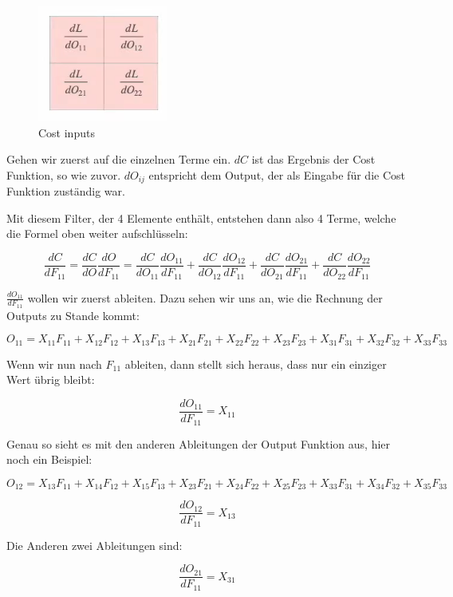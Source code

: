 \documentclass[12pt]{article}
\begin{document}

\begin{figure}[H]
\centering
\includegraphics[scale=0.80]{./Images/TemporaryPlaceholders/Bildschirmfoto vom 2024-05-20 17-15-41.png}
\caption{Cost inputs}
\label{Cost inputs}
\end{figure}

Gehen wir zuerst auf die einzelnen Terme ein. $dC$ ist das Ergebnis der Cost Funktion, so wie zuvor. $dO_{ij}$ entspricht dem Output, der als Eingabe für die Cost Funktion zuständig war.

Mit diesem Filter, der 4 Elemente enthält, entstehen dann also 4 Terme, welche die Formel oben weiter aufschlüsseln:

$$
\frac{dC}{dF_{11}} = 
\frac{dC} {dO} \frac{dO} {dF_{11}}= 
\frac{dC} {dO_{11}} \frac{dO_{11}} {dF_{11}}+
\frac{dC} {dO_{12}} \frac{dO_{12}} {dF_{11}}+
\frac{dC} {dO_{21}} \frac{dO_{21}} {dF_{11}}+
\frac{dC} {dO_{22}} \frac{dO_{22}} {dF_{11}}
$$

$\frac{dO_{11}} {dF_{11}}$ wollen wir zuerst ableiten. Dazu sehen wir uns an, wie die Rechnung der Outputs zu Stande kommt:

$$
O_{11} = X_{11}F_{11}+X_{12}F_{12}+X_{13}F_{13}+X_{21}F_{21}+X_{22}F_{22}+X_{23}F_{23}+X_{31}F_{31}+X_{32}F_{32}+X_{33}F_{33}
$$

Wenn wir nun nach $F_{11}$ ableiten, dann stellt sich heraus, dass nur ein einziger Wert übrig bleibt:

$$\frac{dO_{11}} {dF_{11}} = X_{11}$$

Genau so sieht es mit den anderen Ableitungen der Output Funktion aus, hier noch ein Beispiel:

$$
O_{12} = X_{13}F_{11}+X_{14}F_{12}+X_{15}F_{13}+X_{23}F_{21}+X_{24}F_{22}+X_{25}F_{23}+X_{33}F_{31}+X_{34}F_{32}+X_{35}F_{33}
$$

$$\frac{dO_{12}} {dF_{11}} = X_{13}$$

Die Anderen zwei Ableitungen sind:


$$\frac{dO_{21}} {dF_{11}} = X_{31}$$
\end{document}
